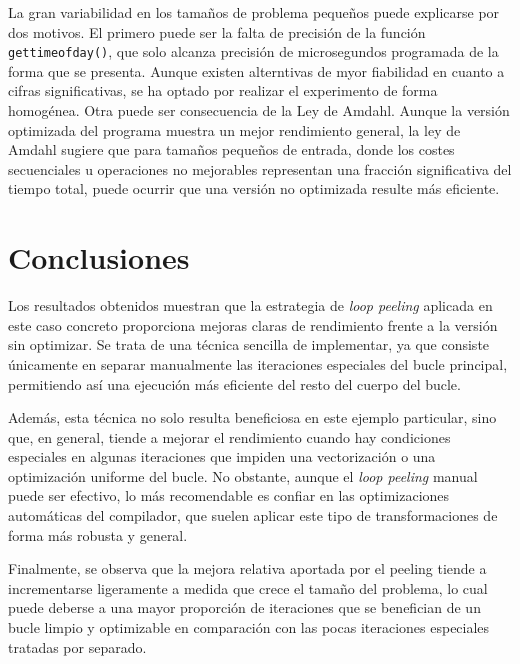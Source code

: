 \documentclass[11pt,a4paper,twoside]{article}
\theoremstyle{definition}
\begin{document}
	La gran variabilidad en los tamaños de problema pequeños puede explicarse por dos motivos. El primero puede ser la falta de precisión de la función \texttt{gettimeofday()}, que solo alcanza precisión de microsegundos programada de la forma que se presenta. Aunque existen alterntivas de myor fiabilidad en cuanto a cifras significativas, se ha optado por realizar el experimento de forma homogénea. Otra puede ser consecuencia de la Ley de Amdahl. Aunque la versión optimizada del programa muestra un mejor rendimiento general, la ley de Amdahl sugiere que para tamaños pequeños de entrada, donde los costes secuenciales u operaciones no mejorables representan una fracción significativa del tiempo total, puede ocurrir que una versión no optimizada resulte más eficiente.
	
	
	\section{Conclusiones}

	Los resultados obtenidos muestran que la estrategia de \textit{loop peeling} aplicada en este caso concreto proporciona mejoras claras de rendimiento frente a la versión sin optimizar. Se trata de una técnica sencilla de implementar, ya que consiste únicamente en separar manualmente las iteraciones especiales del bucle principal, permitiendo así una ejecución más eficiente del resto del cuerpo del bucle.
	
	Además, esta técnica no solo resulta beneficiosa en este ejemplo particular, sino que, en general, tiende a mejorar el rendimiento cuando hay condiciones especiales en algunas iteraciones que impiden una vectorización o una optimización uniforme del bucle. No obstante, aunque el \textit{loop peeling} manual puede ser efectivo, lo más recomendable es confiar en las optimizaciones automáticas del compilador, que suelen aplicar este tipo de transformaciones de forma más robusta y general.
	
	Finalmente, se observa que la mejora relativa aportada por el peeling tiende a incrementarse ligeramente a medida que crece el tamaño del problema, lo cual puede deberse a una mayor proporción de iteraciones que se benefician de un bucle limpio y optimizable en comparación con las pocas iteraciones especiales tratadas por separado.

\printbibliography
	
	
	
\end{document}

